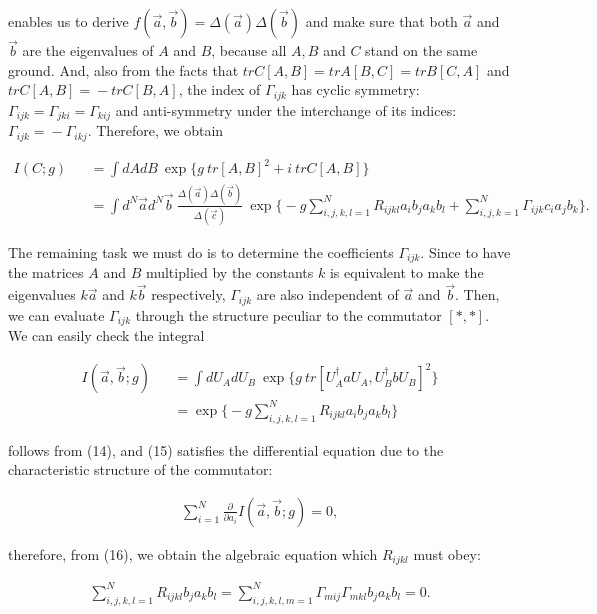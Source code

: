 \documentclass[a4paper,12pt]{article}
\begin{document}
\noindent enables us to derive $f(\vec{a},\vec{b})\! =\! \Delta (\vec{a})\Delta (\vec{b})$ and make sure that both $\vec{a}$ and $\vec{b}$ are the eigenvalues of $A$ and $B$, because all $A,B$ and $C$ stand on the same ground. And, also from the facts that $trC[A,B]=trA[B,C]=trB[C,A]$ and $trC[A,B]\! =\! -trC[B,A]$, the index of $\Gamma_{ijk}$ has cyclic symmetry: $\Gamma_{ijk}\! =\! \Gamma_{jki}\! =\! \Gamma_{kij}$ and anti-symmetry under the interchange of its indices: $\Gamma_{ijk}\! =\! -\Gamma_{ikj}$. Therefore, we obtain 

\begin{eqnarray}
	I(C;g) \! \! \! \! \! \! \! \! 
	& & =\int dAdB \> \exp \Big\{ g\> tr[A,B]^2+i\> trC[A,B] \Big\} 
	\nonumber \\
	& & =\int d^N\vec{a} d^N\vec{b} \> 
	\frac{\Delta (\vec{a})\Delta (\vec{b})}{\Delta(\vec{c})} \> \exp 
	\Big\{ -g\sum_{i,j,k,l=1}^N R_{ijkl} a_ib_ja_kb_l +\sum_{i,j,k=1}^N 
	\Gamma_{ijk} c_ia_jb_k \Big\}. \quad
\end{eqnarray}

The remaining task we must do is to determine the coefficients $\Gamma_{ijk}$. Since to have the matrices $A$ and $B$ multiplied by the constants $k$ is equivalent to make the eigenvalues $k\vec{a}$ and $k\vec{b}$ respectively, $\Gamma_{ijk}$ are also independent of $\vec{a}$ and $\vec{b}$. Then, we can evaluate $\Gamma_{ijk}$ through the structure peculiar to the commutator $[\ast ,\ast ]$. We can easily check the integral 

\begin{eqnarray}
	I(\vec{a},\vec{b};g) \! \! \! \! \! \! \! \! 
	& & =\int dU_AdU_B \> \exp \Big\{ 
	g\> tr[U_A^{\dagger}aU_A,U_B^{\dagger}bU_B]^2 \Big\} \\
	& & =\exp \Big\{ -g\sum_{i,j,k,l=1}^N R_{ijkl} a_ib_ja_kb_l \Big\}
\end{eqnarray}

\noindent follows from (14), and (15) satisfies the differential equation due to the characteristic structure of the commutator: 

\begin{eqnarray}
	\sum_{i=1}^N \frac{\partial}{\partial a_i}I(\vec{a},\vec{b};g)=0, 
\end{eqnarray}

\noindent therefore, from (16), we obtain the algebraic equation which $R_{ijkl}$ must obey: 

\begin{eqnarray}
	\sum_{i,j,k,l=1}^N R_{ijkl}b_ja_kb_l
	=\sum_{i,j,k,l,m=1}^N \Gamma_{mij}\Gamma_{mkl}b_ja_kb_l=0.
\end{eqnarray}
\end{document}
